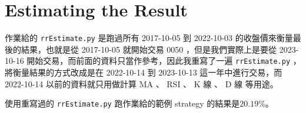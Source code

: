 \setcounter{section}{-1}


\section{Estimating the Result}

作業給的 \texttt{rrEstimate.py} 是跑過所有 2017-10-05 到 2022-10-03 的收盤價來衡量最後的結果，也就是從 2017-10-05 就開始交易 0050 ，但是我們實際上是要從 2023-10-16 開始交易，而前面的資料只當作參考，因此我重寫了一遍 \texttt{rrEstimate.py} ，將衡量結果的方式改成是在 2022-10-14 到 2023-10-13 這一年中進行交易，而 2022-10-14 以前的資料就只用做計算 MA 、 RSI 、 K 線 、 D 線 等用途。

使用重寫過的 \texttt{rrEstimate.py} 跑作業給的範例 strategy 的結果是$20.19\%$。


